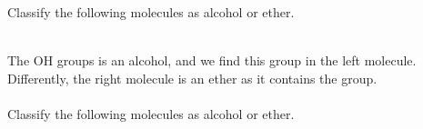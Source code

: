 \documentclass[main.tex]{subfiles}
\begin{document}
\begin{description}
\begin{example} %
Classify the following molecules as alcohol or ether.
\begin{center} \hspace{0.5cm}  \end{center}
\\
The OH groups is an alcohol, and we find this group in the left molecule. Differently, the right molecule is an ether as it contains the  group. \\
\faDiamond\ \\
Classify the following molecules as alcohol or ether.
\begin{center} \hspace{0.5cm}  \end{center}
\end{example}%





\end{description}
\end{document}
